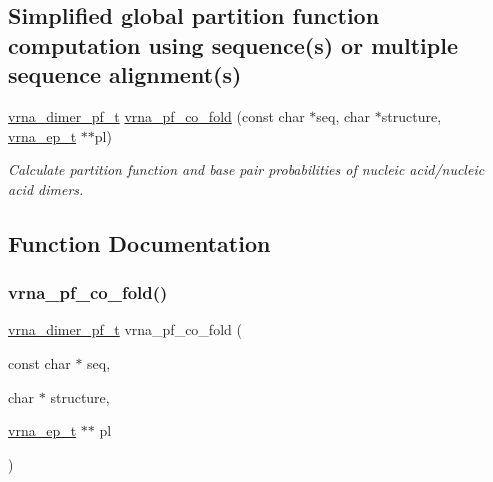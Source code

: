 \subsection*{Simplified global partition function computation using sequence(s) or multiple sequence alignment(s)}
\begin{DoxyCompactItemize}
\item 
\mbox{\hyperlink{group__pf__cofold_ga444df1587c9a2ca15b8eb25188f629c3}{vrna\+\_\+dimer\+\_\+pf\+\_\+t}} \mbox{\hyperlink{group__part__func__global_gaf2b846f7ac382686f35ff7b9202fdd5c}{vrna\+\_\+pf\+\_\+co\+\_\+fold}} (const char $\ast$seq, char $\ast$structure, \mbox{\hyperlink{group__struct__utils__plist_gab9ac98ab55ded9fb90043b024b915aca}{vrna\+\_\+ep\+\_\+t}} $\ast$$\ast$pl)
\begin{DoxyCompactList}\small\item\em Calculate partition function and base pair probabilities of nucleic acid/nucleic acid dimers. \end{DoxyCompactList}\end{DoxyCompactItemize}


\subsection{Function Documentation}
\mbox{\label{group__part__func__global_gaf2b846f7ac382686f35ff7b9202fdd5c}} 
\subsubsection{\texorpdfstring{vrna\_pf\_co\_fold()}{vrna\_pf\_co\_fold()}}
{\footnotesize\ttfamily \mbox{\hyperlink{group__pf__cofold_ga444df1587c9a2ca15b8eb25188f629c3}{vrna\+\_\+dimer\+\_\+pf\+\_\+t}} vrna\+\_\+pf\+\_\+co\+\_\+fold (\begin{DoxyParamCaption}\item[{const char $\ast$}]{seq,  }\item[{char $\ast$}]{structure,  }\item[{\mbox{\hyperlink{group__struct__utils__plist_gab9ac98ab55ded9fb90043b024b915aca}{vrna\+\_\+ep\+\_\+t}} $\ast$$\ast$}]{pl }\end{DoxyParamCaption})}



